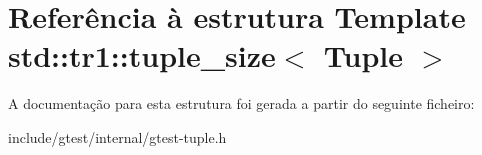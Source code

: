 \hypertarget{structstd_1_1tr1_1_1tuple__size}{\section{Referência à estrutura Template std\-:\-:tr1\-:\-:tuple\-\_\-size$<$ Tuple $>$}
\label{structstd_1_1tr1_1_1tuple__size}
}


A documentação para esta estrutura foi gerada a partir do seguinte ficheiro\-:\begin{DoxyCompactItemize}
\item 
include/gtest/internal/gtest-\/tuple.\-h\end{DoxyCompactItemize}

